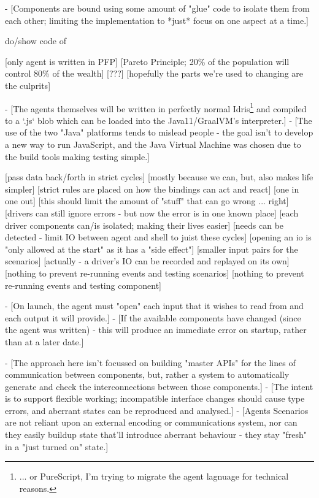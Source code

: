 - [Components are bound using some amount of "glue" code to isolate them from each other; limiting the implementation to *just* focus on one aspect at a time.]


do/show code of


[only agent is written in PFP]
    [Pareto Principle; 20\% of the population will control 80\% of the wealth]
    [???]
    [hopefully the parts we're used to changing are the culprits]

- [The agents themselves will be written in perfectly normal Idris\footnote{... or PureScript, I'm trying to migrate the agent lagnuage for technical reasons.} and compiled to a `.js` blob which can be loaded into the Java11/GraalVM's interpreter.]
    - [The use of the two "Java" platforms tends to mislead people - the goal isn't to develop a new way to run JavaScript, and the Java Virtual Machine was chosen due to the build tools making testing simple.]



[pass data back/forth in strict cycles]
    [mostly because we can, but, also makes life simpler]
    [strict rules are placed on how the bindings can act and react]
        [one in one out]
    [this should limit the amount of "stuff" that can go wrong ... right]
        [drivers can still ignore errors - but now the error is in one known place]
    [each driver components can/is isolated; making their lives easier]
[needs can be detected - limit IO between agent and shell to juist these cycles]
    [opening an io is "only allowed at the start" as it has a "side effect"]
    [smaller input pairs for the scenarios]
        [actually - a driver's IO can be recorded and replayed on its own]
    [nothing to prevent re-running events and testing scenarios]
    [nothing to prevent re-running events and testing component]

    - [On launch, the agent must "open" each input that it wishes to read from and each output it will provide.]
        - [If the available components have changed (since the agent was written) - this will produce an immediate error on startup, rather than at a later date.]




- [The approach here isn't focussed on building "master APIs" for the lines of communication between components, but, rather a system to automatically generate and check the interconnections between those components.]
	- [The intent is to support flexible working; incompatible interface changes should cause type errors, and aberrant states can be reproduced and analysed.]
- [Agents Scenarios are not reliant upon an external encoding or communications system, nor can they easily buildup state that'll introduce aberrant behaviour - they stay "fresh" in a "just turned on" state.]

